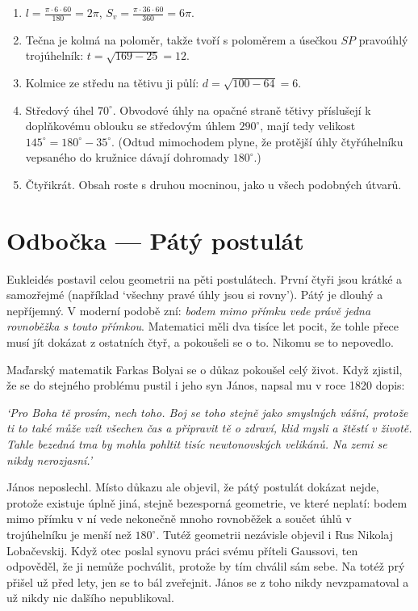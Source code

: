 \begin{solution}
  \begin{enumerate}[label=(\alph*)]
    \item $l = \frac{\pi\cdot 6\cdot 60}{180} = 2\pi$, $S_v = \frac{\pi\cdot 36\cdot 60}{360} = 6\pi$.
    \item Tečna je kolmá na poloměr, takže tvoří s poloměrem a úsečkou $SP$ pravoúhlý trojúhelník: $t = \sqrt{169 - 25} = 12$.
    \item Kolmice ze středu na tětivu ji půlí: $d = \sqrt{100 - 64} = 6$.
    \item Středový úhel $70^\circ$. Obvodové úhly na opačné straně tětivy příslušejí k doplňkovému oblouku se středovým úhlem $290^\circ$, mají tedy velikost $145^\circ = 180^\circ - 35^\circ$. (Odtud mimochodem plyne, že protější úhly čtyřúhelníku vepsaného do kružnice dávají dohromady $180^\circ$.)
    \item Čtyřikrát. Obsah roste s druhou mocninou, jako u všech podobných útvarů.
  \end{enumerate}
\end{solution}

\section{Odbočka --- Pátý postulát}\label{sec:paty-postulat}

Eukleidés postavil celou geometrii na pěti postulátech. První čtyři jsou krátké a samozřejmé (například `všechny pravé úhly jsou si rovny'). Pátý je dlouhý a nepříjemný. V moderní podobě zní: \textit{bodem mimo přímku vede právě jedna rovnoběžka s touto přímkou}. Matematici měli dva tisíce let pocit, že tohle přece musí jít dokázat z ostatních čtyř, a pokoušeli se o to. Nikomu se to nepovedlo.

Maďarský matematik Farkas Bolyai se o důkaz pokoušel celý život. Když zjistil, že se do stejného problému pustil i jeho syn János, napsal mu v roce 1820 dopis:
\begin{center}
  \begin{minipage}{0.85\textwidth}
    \textit{`Pro Boha tě prosím, nech toho. Boj se toho stejně jako smyslných vášní, protože ti to také může vzít všechen čas a připravit tě o zdraví, klid mysli a štěstí v životě. Tahle bezedná tma by mohla pohltit tisíc newtonovských velikánů. Na zemi se nikdy nerozjasní.'}
  \end{minipage}
\end{center}
János neposlechl. Místo důkazu ale objevil, že pátý postulát dokázat nejde, protože existuje úplně jiná, stejně bezesporná geometrie, ve které neplatí: bodem mimo přímku v ní vede nekonečně mnoho rovnoběžek a součet úhlů v trojúhelníku je menší než $180^\circ$. Tutéž geometrii nezávisle objevil i Rus Nikolaj Lobačevskij. Když otec poslal synovu práci svému příteli Gaussovi, ten odpověděl, že ji nemůže pochválit, protože by tím chválil sám sebe. Na totéž prý přišel už před lety, jen se to bál zveřejnit. János se z toho nikdy nevzpamatoval a už nikdy nic dalšího nepublikoval.

